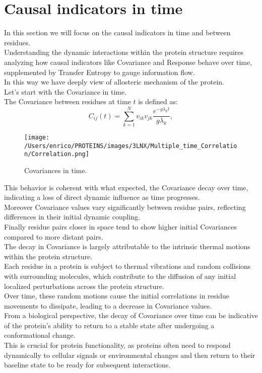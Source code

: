 \documentclass[English, Lau, oneside]{sapthesis}
\begin{document}
\section{Causal indicators in time}
\noindent In this section we will focus on the causal indicators in time and between residues.\\
Understanding the dynamic interactions within the protein structure requires analyzing how causal indicators like Covariance and Response behave over time, supplemented by Transfer Entropy to gauge information flow.\\
In this way we have deeply view of allosteric mechanism of the protein.\\
Let's start with the Covariance in time.\\
The Covariance between residues at time \(t\) is defined as:
\[
C_{ij}(t) = \sum_{k=1}^N v_{ik} v_{jk} \frac{e^{-g \lambda_k t}}{g \lambda_k} ,
\]
\begin{figure}[h!]
    \centering
    \texttt{[image: /Users/enrico/PROTEINS/images/3LNX/Multiple\_time\_Correlation/Correlation.png]}    
    \caption{Covariances in time.}
\end{figure}
This behavior is coherent with what expected, the Covariance decay over time, indicating a loss of direct dynamic influence as time progresses.\\
Moreover Covariance values vary significantly between residue pairs, reflecting differences in their initial dynamic coupling.\\
Finally residue pairs closer in space tend to show higher initial Covariances compared to more distant pairs.\\
The decay in Covariance is largely attributable to the intrinsic thermal motions within the protein structure.\\
Each residue in a protein is subject to thermal vibrations and random collisions with surrounding molecules, which contribute to the diffusion of any initial localized perturbations across the protein structure.\\
Over time, these random motions cause the initial correlations in residue movements to dissipate, leading to a decrease in Covariance values.\\
From a biological perspective, the decay of Covariance over time can be indicative of the protein’s ability to return to a stable state after undergoing a conformational change.\\
This is crucial for protein functionality, as proteins often need to respond dynamically to cellular signals or environmental changes and then return to their baseline state to be ready for subsequent interactions.\\
\end{document}
